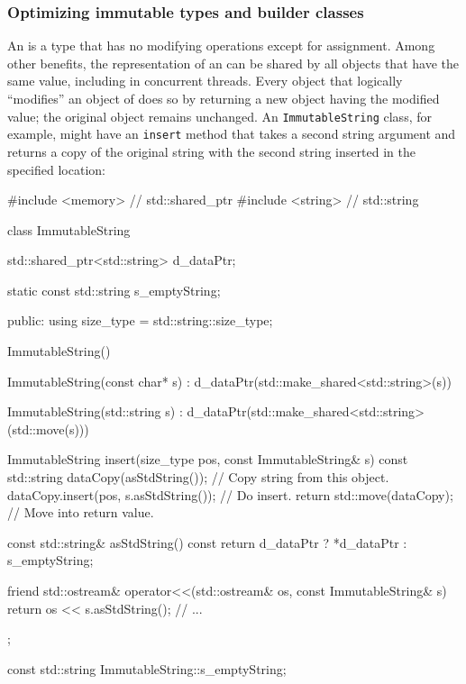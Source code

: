 \subsubsection[Optimizing immutable types and builder classes]{Optimizing immutable types and builder classes}\label{optimizing-immutable-types-and-builder-classes}

An  is a type that has no modifying operations
except for assignment. Among other benefits, the representation of an
 can be shared by all objects that have the same
value, including in concurrent threads. Every object that logically
``modifies'' an object of  does so by returning a
new object having the modified value; the original object remains
unchanged. An \lstinline!ImmutableString! class, for example, might have an
\lstinline!insert! method that takes a second string argument and returns a
copy of the original string with the second string inserted in the
specified location:

\begin{emcppslisting}
#include <memory>  // std::shared_ptr
#include <string>  // std::string

class ImmutableString
{
    std::shared_ptr<std::string> d_dataPtr;

    static const std::string s_emptyString;

public:
    using size_type = std::string::size_type;

    ImmutableString() {}

    ImmutableString(const char* s)
        : d_dataPtr(std::make_shared<std::string>(s)) { }

    ImmutableString(std::string s)
        : d_dataPtr(std::make_shared<std::string>(std::move(s))) { }

    ImmutableString insert(size_type pos, const ImmutableString& s) const
    {
        std::string dataCopy(asStdString());    // Copy string from this object.
        dataCopy.insert(pos, s.asStdString());  // Do insert.
        return std::move(dataCopy);             // Move into return value.
    }

    const std::string& asStdString() const
    {
        return d_dataPtr ? *d_dataPtr : s_emptyString;
    }

    friend std::ostream& operator<<(std::ostream& os, const ImmutableString& s)
    {
        return os << s.asStdString();
    }
    // ...
};

const std::string ImmutableString::s_emptyString{};
\end{emcppslisting}
    

